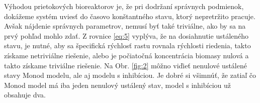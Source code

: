 Výhodou prietokových bioreaktorov je, že pri dodržaní správnych podmienok, dokážeme systém uviesť do časovo konštantného stavu, ktorý nepretržito pracuje. Avšak nájdenie správnych parametrov, nemusí byť také triviálne, ako by sa na prvý pohľad mohlo zdať. Z rovnice \ref{eq:5}
vyplýva, že na dosiahnutie ustáleného stavu, je nutné, aby sa špecifická rýchlosť rastu rovnala rýchlosti riedenia, takto získame netriviálne riešenie, alebo je počiatočná koncentrácia biomasy nulová a takto získame triviálne riešenie.
Na Obr. \ref{fig:2} môžno viďieť nenulové ustálené stavy Monod modelu, ale aj modelu s inhibíciou. Je dobré si všimnúť, že zatiaľ čo Monod model má iba jeden nenulový ustálený stav, model s inhibíciou už obsahuje dva.

